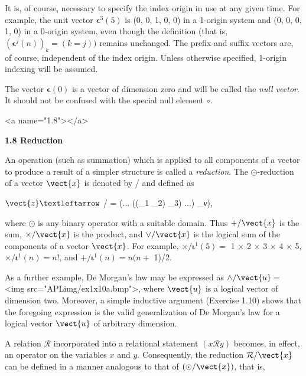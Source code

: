 \par It is, of course, necessary to specify the index origin in use at any given time. For example, the unit vector $\textbf{ϵ}^3(5)$ is (0, 0, 1, 0, 0) in a 1-origin system and (0, 0, 0, 1, 0) in a 0-origin system, even though the definition (that is, $(\textbf{ϵ}^j(n))_k = (k = j))$ remains unchanged. The prefix and suffix vectors are, of course, independent of the index origin. Unless otherwise specified, 1-origin indexing will be assumed.

\par The vector $\textbf{ϵ}(0)$ is a vector of dimension zero and will be called the \textit{null vector}. It should not be confused with the special null element $∘$.

<a name="1.8"></a>
\par \textbf{1.8 Reduction}

\par An operation (such as summation) which is applied to all components of a vector to produce a result of a simpler structure is called a \textit{reduction}. The $\odot$-reduction of a vector $\vect{x}$ is denoted by
\odot/ and defined as

\par $\vect{z} ←$ 
\odot/ \leftrightarrow {} = (... ((_1
\odot {}_2)
\odot {}_3)
\odot ...) 
\odot {}_{\textit{ν}}),

\par where $\odot$ is any binary operator with a suitable domain. Thus $+/\vect{x}$ is the sum, $\times/\vect{x}$ is the product, and $\vee/\vect{x}$ is the logical sum of the components of a vector $\vect{x}$. For example, $\times/\textbf{ι}^1(5) =$ 1 $\times$ 2 $\times$ 3 $\times$ 4 $\times$ 5, $\times/\textbf{ι}^1(n) = n!$, and $+/\textbf{ι}^1(n) = n(n +$ 1)/2.

\par As a further example, De Morgan's law may be expressed as $\wedge/\vect{u} =$ <img src="APLimg/ex1x10a.bmp">, where $\vect{u}$ is a logical vector of dimension two. Moreover, a simple inductive argument (Exercise 1.10) shows that the foregoing expression is the valid generalization of De Morgan's law for a logical vector $\vect{u}$ of arbitrary dimension.

\par A relation $\mathcal{R}$ incorporated into a relational statement $(x\mathcal{R}y)$ becomes, in effect, an operator on the variables $x$ and $y$. Consequently, the reduction $\mathcal{R}/\vect{x}$ can be defined in a manner analogous to that of $(\odot/\vect{x})$, that is,

